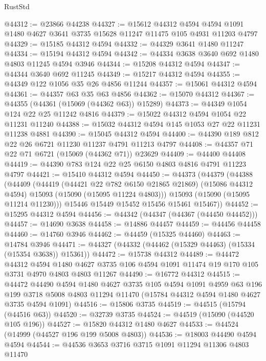 \begin{lexlean}{RustStd}
\begin{coremodule}
@44312 := @23866 @44238
@44327 := @15612
    @44312
    @4594
    @4594
    @1091
    @1480
    @4627
    @3641
    @3735
    @15628
    @11247
    @11475
    @105
    @4931
    @11203
    @4797
@44329 := @15185 @44312 @4594
@44332 := @44329 @3641 @1480 @11247
@44334 := @15194 @44312 @4594
@44342 := @44334 @3638 @3640 @692 @1480 @4803 @11245 @4594 @3946
@44344 := @15208 @44312 @4594
@44347 := @44344 @3640 @692 @11245
@44349 := @15217 @44312 @4594
@44355 := @44349 @122 @1056 @35 @26 @4856 @11244
@44357 := @15061 @44312 @4594
@44361 := @44357 @63 @35 @63 @4856
@44362 := @15070 @44312
@44367 := @44355 (@44361 (@15069 (@44362 @63)) @15289)
@44373 := @44349 @1054 @124 @22 @25 @11242 @4816
@44379 := @15022 @44312 @4594 @1054 @22 @11231 @11240
@44388 := @15032 @44312 @4594 @145 @1053 @27 @22 @11231 @11238 @4881
@44390 := @15045 @44312 @4594
@44400 := @44390 @189 @812 @22 @26 @6721 @11230 @11237 @4791 @11213 @4797
@44408 := @44357 @71 @22 @71 @6721 (@15069 (@44362 @71)) @23629
@44409 := @44400 @44408
@44419 := @44390 @783 @124 @22 @25 @6150 @4803 @4816 @4791 @11223 @4797
@44421 := @15410 @44312 @4594
@44450 := @44373
    (@44379
      (@44388
        (@44409
          (@44419
            (@44421 @22 @782 @6150 @21865 @21869)
            (@15086 @44312 @4594)
            @15093
            (@15090 (@15095 @11224 @4803)))
          @15093
          (@15090 (@15095 @11214 @11230)))
        @15446
        @15449
        @15452
        @15456
        @15461
        @15467))
@44452 := @15295 @44312 @4594
@44456 := @44342 (@44347 (@44367 (@44450 @44452)))
@44457 := @14690 @3638
@44458 := @14886 @44457
@44459 := @44456 @44458
@44460 := @14760 @3946
@44462 := @44459 (@15325 @44460)
@44463 := @14784 @3946
@44471 := @44327 (@44332 (@44462 (@15329 @44463) (@15334 (@15354 @3638)) @15361))
@44472 := @15738 @44312
@44489 := @44472
    @44312
    @4594
    @1480
    @4627
    @3735
    @106
    @4594
    @1091
    @11474
    @19
    @170
    @105
    @3731
    @4970
    @4803
    @4803
    @11267
@44490 := @16772 @44312
@44515 := @44472
    @44490
    @4594
    @1480
    @4627
    @3735
    @105
    @4594
    @1091
    @4959
    @63
    @196
    @199
    @3718
    @5008
    @4803
    @11294
    @11470
    (@15784 @44312 @4594 @1480 @4627 @3735 @4594 @1091)
@44516 := @15806 @3735
@44519 := @44515 (@15794 (@44516 @63))
@44520 := @32739 @3735
@44524 := @44519 (@15090 (@44520 @105 @196))
@44527 := @15820 @44312 @1480 @4627
@44533 := @44524 (@14999 (@44527 @196 @199 @5008 @4803))
@44536 := @18003 @44490 @4594 @4594
@44544 := @44536 @3653 @3716 @3715 @1091 @11294 @11306 @4803 @11470

\end{coremodule}
\end{lexlean}
